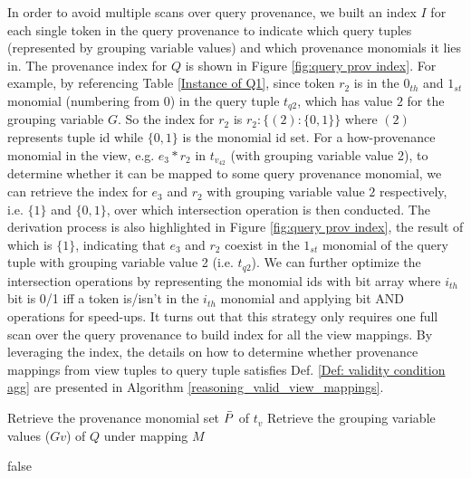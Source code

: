 \begin{example}
In order to avoid multiple scans over query provenance, we built an index $I$ for each single token in the query provenance to indicate which query tuples (represented by grouping variable values) and which provenance monomials it lies in. The provenance index for $Q$ is shown in Figure \ref{fig:query prov index}. For example, by referencing Table \ref{Instance of Q1}, since token $r_2$ is in the $0_{th}$ and $1_{st}$ monomial (numbering from 0) in the query tuple $t_{q2}$, which has value $2$ for the grouping variable $G$. So the index for $r_2$ is $r_2:\{(2):\{0,1\}\}$ where $(2)$ represents tuple id while $\{0,1\}$ is the monomial id set. For a how-provenance monomial in the view, e.g. $e_3*r_2$ in $t_{v_42}$ (with grouping variable value 2), to determine whether it can be mapped to some query provenance monomial, we can retrieve the index for $e_3$ and $r_2$ with grouping variable value $2$ respectively, i.e. $\{1\}$ and $\{0,1\}$, over which intersection operation is then conducted. The derivation process is also highlighted in Figure \ref{fig:query prov index}, the result of which is $\{1\}$, indicating that $e_3$ and $r_2$ coexist in the $1_{st}$ monomial of the query tuple with grouping variable value 2 (i.e. $t_{q2}$). We can further optimize the intersection operations by representing the monomial ids with bit array where $i_{th}$ bit is 0/1 iff a token is/isn't in the $i_{th}$ monomial and applying bit AND operations for speed-ups. It turns out that this strategy only requires one full scan over the query provenance to build index for all the view mappings. By leveraging the index, the details on how to determine whether provenance mappings from view tuples to query tuple satisfies Def. \ref{Def: validity condition agg} are presented in Algorithm \ref{reasoning_valid_view_mappings}.

\begin{algorithm}[h!] 
\footnotesize

 
{
    Retrieve the provenance monomial set $\Bar{P}$ of $t_v$
    Retrieve the grouping variable values ($Gv$) of $Q$ under mapping $M$

    {
        {
            {
                \Return false
            }
            
}}}
\end{algorithm}
\end{example}
